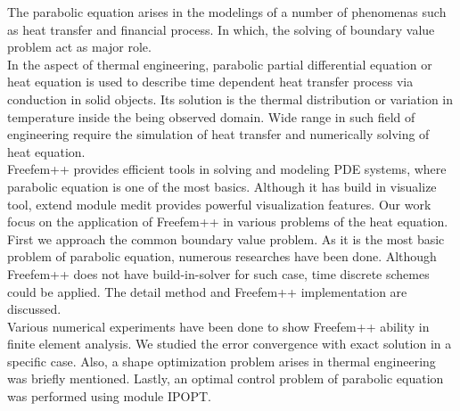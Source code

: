 The parabolic equation arises in the modelings of a number of phenomenas such as heat transfer and financial process. In which, the solving of boundary value problem act as major role.\\
In the aspect of thermal engineering, parabolic partial differential equation or heat equation is used to describe time dependent heat transfer process via conduction in solid objects. Its solution is the thermal distribution or variation in temperature inside the being observed domain. Wide range in such field of engineering require the simulation of heat transfer and numerically solving of heat equation.\\
Freefem++ provides efficient tools in solving and modeling PDE systems, where parabolic equation is one of the most basics. Although it has build in visualize tool, extend module medit provides powerful visualization features. Our work focus on the application of Freefem++ in various problems of the heat equation.\\
First we approach the common boundary value problem. As it is the most basic problem of parabolic equation, numerous researches have been done. Although Freefem++ does not have build-in-solver for such case, time discrete schemes could be applied. The detail method and Freefem++ implementation are discussed.\\
Various numerical experiments have been done to show Freefem++ ability in finite element analysis. We studied the error convergence with exact solution in a specific case. Also, a shape optimization problem arises in thermal engineering was briefly mentioned. Lastly, an optimal control problem of parabolic equation was performed using module IPOPT.
